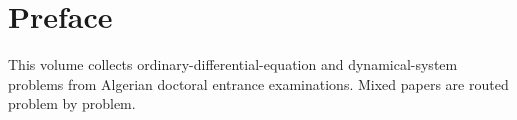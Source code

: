 \documentclass[print]{docmathdz}
\begin{document}
\chapter*{Preface}
This volume collects ordinary-differential-equation and dynamical-system problems from Algerian doctoral entrance examinations. Mixed papers are routed problem by problem.
\mainmatter


\backmatter\printbibliography[heading=bibintoc,title={References}]\printindex
\end{document}

